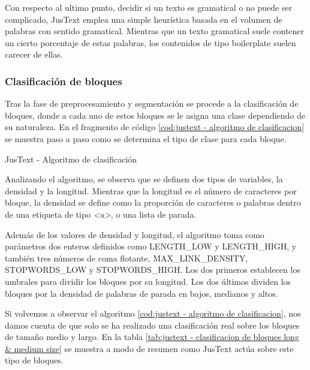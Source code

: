 Con respecto al ultimo punto, decidir si un texto es gramatical o no puede ser complicado, JusText emplea 
una simple heurística basada en el volumen de palabras con sentido gramatical. Mientras que un texto 
gramatical suele contener un cierto porcentaje de estas palabras, los contenidos de tipo boilerplate suelen 
carecer de ellas.

\subsubsection{Clasificación de bloques}
\label{subsubsec:clasificacion de bloques}

Tras la fase de preprocesamiento y segmentación se procede a la clasificación de bloques, donde a cada uno
de estos bloques se le asigna una clase dependiendo de su naturaleza. En el fragmento de código 
\ref{cod:justext - algoritmo de clasificacion} se muestra paso a paso como se determina el tipo de clase 
para cada bloque.

\begin{codefloat}
  
  \caption{JusText - Algoritmo de clasificación}
  \label{cod:justext - algoritmo de clasificacion}
\end{codefloat}

Analizando el algoritmo, se observa que se definen dos tipos de variables, la densidad y la longitud. 
Mientras que la longitud es el número de caracteres por bloque, la densidad se define como la proporción 
de caracteres o palabras dentro de una etiqueta de tipo \emph{<a>}, o una lista de parada.

Además de los valores de densidad y longitud, el algoritmo toma como parámetros dos enteros definidos como
LENGTH\_LOW y LENGTH\_HIGH, y también tres números de coma flotante, MAX\_LINK\_DENSITY, STOPWORDS\_LOW y
STOPWORDS\_HIGH. Los dos primeros establecen los umbrales para dividir los bloques por su longitud. Los dos 
últimos dividen los bloques por la densidad de palabras de parada en bajos, medianos y altos.

Si volvemos a observar el algoritmo \ref{cod:justext - algoritmo de clasificacion}, nos damos cuenta de
que solo se ha realizado una clasificación real sobre los bloques de tamaño medio y largo. En la tabla
\ref{tab:justext - clasificacion de bloques long & medium size} se muestra a modo de resumen como JusText
actúa sobre este tipo de bloques.


